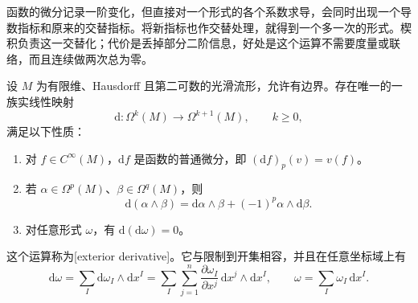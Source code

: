 函数的微分记录一阶变化，但直接对一个形式的各个系数求导，会同时出现一个导数指标和原来的交替指标。将新指标也作交替处理，就得到一个多一次的形式。楔积负责这一交替化；代价是丢掉部分二阶信息，好处是这个运算不需要度量或联络，而且连续做两次总为零。

\begin{theorem}\label{g1:thm:exterior-derivative}
	设 \(M\) 为有限维、Hausdorff 且第二可数的光滑流形，允许有边界。存在唯一的一族实线性映射
	\[
		\mathrm{d}:\Omega^k(M)\longrightarrow\Omega^{k+1}(M),\qquad k\geq0,
	\]
	满足以下性质：
	\begin{enumerate}
		\item 对 \(f\in C^\infty(M)\)，\(\mathrm{d}f\) 是函数的普通微分，即 \((\mathrm{d}f)_p(v)=v(f)\)。
		\item 若 \(\alpha\in\Omega^p(M)\)、\(\beta\in\Omega^q(M)\)，则
		\[
			\mathrm{d}(\alpha\wedge\beta)=\mathrm{d}\alpha\wedge\beta+(-1)^p\alpha\wedge\mathrm{d}\beta.
		\]
		\item 对任意形式 \(\omega\)，有 \(\mathrm{d}(\mathrm{d}\omega)=0\)。
	\end{enumerate}
	这个运算称为[exterior derivative]。它与限制到开集相容，并且在任意坐标域上有
	\begin{equation}
		\label{g1:eq:exterior-coordinate-formula}
		\mathrm{d}\omega
		=\sum_I\mathrm{d}\omega_I\wedge\mathrm{d}x^I
		=\sum_I\sum_{j=1}^n\frac{\partial\omega_I}{\partial x^j}\,\mathrm{d}x^j\wedge\mathrm{d}x^I,
		\qquad \omega=\sum_I\omega_I\,\mathrm{d}x^I.
	\end{equation}
\end{theorem}
